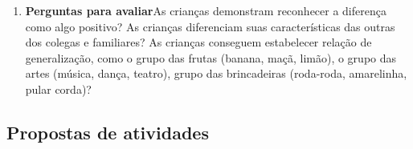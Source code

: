 \documentclass[11pt]{extarticle}
\begin{document}
\begin{enumerate}
\item \textbf{Perguntas para avaliar}\quad As crianças demonstram reconhecer a diferença como algo positivo? As crianças diferenciam suas características das outras dos colegas e familiares? As crianças conseguem estabelecer relação de generalização, como o grupo das frutas (banana, maçã, limão), o grupo das artes (música, dança, teatro), grupo das brincadeiras (roda-roda, amarelinha, pular corda)? 
\end{enumerate}


\subsection{Propostas de atividades}

\end{document}

